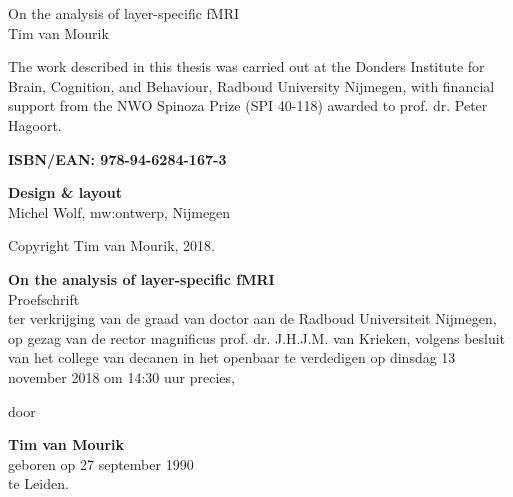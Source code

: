 \thispagestyle{empty}

{\setlength{\parindent}{0cm}
	\begin{flushright}
		\vspace{120pt}
		\huge{On the analysis of layer-specific fMRI}\\
		\vspace{80pt}
		\large{Tim van Mourik}
	\end{flushright}
}

\newpage

\thispagestyle{empty}
{\setlength{\parindent}{0cm}\raggedright\smaller
\null\vfill

The work described in this thesis was carried out at the Donders Institute for Brain, Cognition, and Behaviour, Radboud University Nijmegen, with financial support from the NWO Spinoza Prize (SPI 40-118) awarded to prof. dr. Peter Hagoort.

\vspace{12pt}

\textbf{ISBN/EAN: 978-94-6284-167-3}

\vspace{12pt}
\textbf{Design \& layout}\\
Michel Wolf, mw:ontwerp, Nijmegen

\vspace{12pt}
Copyright {\textcopyright} Tim van Mourik, 2018. 
}

\newpage

\thispagestyle{empty}
\begin{minipage}[c]{100mm}

\begin{center}
\vspace{20pt}
\large{\textbf{On the analysis of layer-specific fMRI}}\\
\vspace{70pt}
\large{Proefschrift}\\
\vspace{60pt}
ter verkrijging van de graad van doctor aan de Radboud Universiteit Nijmegen, op gezag van de rector magnificus prof. dr. J.H.J.M. van Krieken, volgens besluit van het college van decanen in het openbaar te verdedigen op dinsdag 13 november 2018 om 14:30 uur precies,

\vspace{30pt}
door
\vspace{30pt}

{\textbf{Tim van Mourik}}\\
geboren op 27 september 1990\\
te Leiden.
\end{center}

\end{minipage}
%
\newpage
\thispagestyle{empty}

